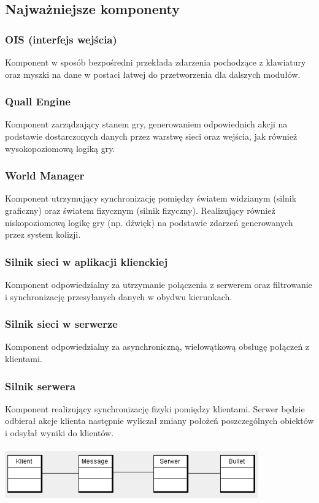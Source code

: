 \documentclass[12pt,a4paper,twoside]{article}
\begin{document}
\subsection{Najważniejsze komponenty}



\subsubsection{OIS (interfejs wejścia)}
Komponent w sposób bezpośredni przekłada zdarzenia pochodzące z klawiatury oraz myszki na dane w postaci łatwej do przetworzenia dla dalszych modułów.
\subsubsection{Quall Engine}
Komponent zarządzający stanem gry, generowaniem odpowiednich akcji na podstawie dostarczonych danych przez warstwę sieci oraz wejścia, jak również wysokopoziomową logiką gry.
\subsubsection{World Manager}
Komponent utrzymujący synchronizację pomiędzy światem widzianym (silnik graficzny) oraz światem fizycznym (silnik fizyczny). Realizujący również niskopoziomową logikę gry (np. dźwięk) na podstawie zdarzeń generowanych przez system kolizji.
\subsubsection{Silnik sieci w aplikacji klienckiej}
Komponent odpowiedzialny za utrzymanie połączenia z serwerem oraz filtrowanie i synchronizację przesyłanych danych w obydwu kierunkach.
\subsubsection{Silnik sieci w serwerze}
Komponent odpowiedzialny za asynchroniczną, wielowątkową obsługę połączeń z klientami.
\subsubsection{Silnik serwera}
Komponent realizujący synchronizację fizyki pomiędzy klientami. Serwer będzie odbierał akcje klienta następnie wyliczał zmiany położeń poszczególnych obiektów i odsyłał wyniki do klientów.\\
\\
\includegraphics{pics/classdiagram.png}
\end{document}
